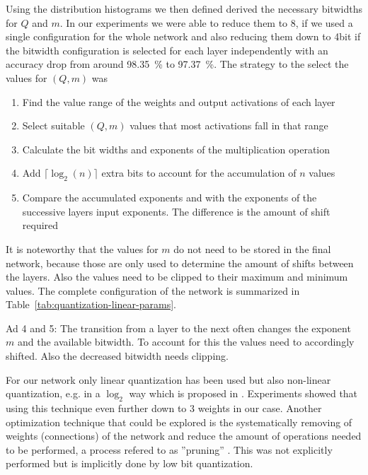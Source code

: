 Using the distribution histograms we then defined derived the necessary bitwidths for $Q$ and $m$. In our experiments we were able to reduce them to \SI{8}{\bit}, if we used a single configuration for the whole network and also reducing them down to 4bit if the bitwidth configuration is selected for each layer independently with an accuracy drop from around \SI{98.35}{\percent} to \SI{97.37}{\percent}. The strategy to the select the values for $(Q,m)$ was
\begin{enumerate}
	\item Find the value range of the weights and output activations of each layer
	\item Select suitable $(Q,m)$ values that most activations fall in that range
	\item Calculate the bit widths and exponents of the multiplication operation
	\item Add $\lceil \log_2(n) \rceil$ extra bits to account for the accumulation of $n$ values
	\item Compare the accumulated exponents and with the exponents of the successive layers input exponents. The difference is the amount of shift required
\end{enumerate}
It is noteworthy that the values for $m$ do not need to be stored in the final network, because those are only used to determine the amount of shifts between the layers. Also the values need to be clipped to their maximum and minimum values. The complete configuration of the network is summarized in Table~\ref{tab:quantization-linear-params}.

Ad 4 and 5: The transition from a layer to the next often changes the exponent $m$ and the available bitwidth. To account for this the values need to accordingly shifted. Also the decreased bitwidth needs clipping.

For our network only linear quantization has been used but also non-linear quantization, e.g. in a $\log_2$ way which is proposed in \cite{Lee:2017aa}. Experiments showed that using this technique even further down to \SI{3}{\bit} weights in our case.
Another optimization technique that could be explored is the systematically removing of weights (connections) of the network and reduce the amount of operations needed to be performed, a process refered to as ''pruning'' \cite{Zhu:2017aa}. This was not explicitly performed but is implicitly done by low bit quantization.

